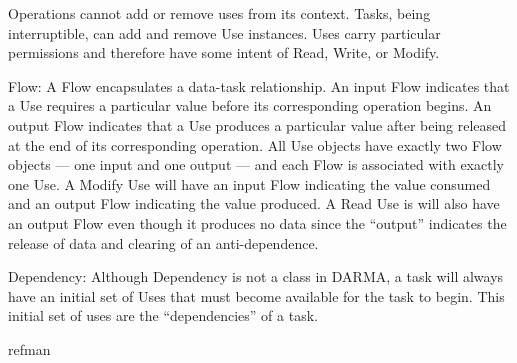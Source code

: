 \begin{compactdesc}
Operations cannot add or remove uses from its context.
Tasks, being interruptible, can add and remove Use instances.
Uses carry particular permissions and therefore have some intent of Read, Write, or Modify.
\item [Flow:] A Flow encapsulates a data-task relationship. 
An input Flow indicates that a Use requires a particular value before its
corresponding \gls{operation} begins.
An output Flow indicates that a Use produces a particular value after being
released at the end of its corresponding \gls{operation}.
All Use objects have exactly two Flow objects --- one input and one output ---
and each Flow is associated with exactly one Use.
A Modify Use will have an input Flow indicating the value consumed and an output Flow indicating the value produced.
A Read Use is will also have an output Flow even though it produces no data since the ``output'' indicates the release of data and clearing of an anti-dependence.
\item [Dependency:] Although Dependency is not a class in \gls{DARMA}, a
  \gls{task} will always have an initial set of Uses that must become
  available for the \gls{task} to begin.
  This initial set of uses are the ``dependencies'' of a \gls{task}.
\end{compactdesc} 

{refman}
